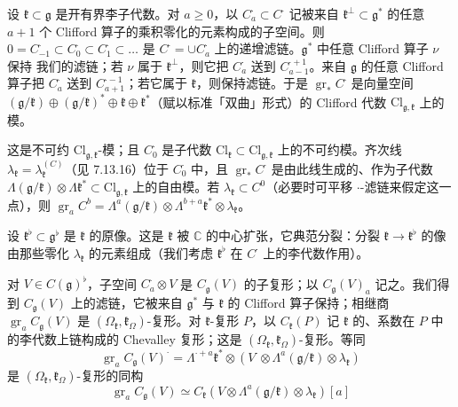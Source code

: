  设 $\mathfrak{k}\subset\mathfrak{g}$ 是开有界李子代数。对 $a\ge0$，以 $C^{\cdot}_{a}\subset C^{\cdot}$ 记被来自 $\mathfrak{k}^{\perp}\subset\mathfrak{g}^{*}$ 的任意 $a+1$ 个 Clifford 算子的乘积零化的元素构成的子空间。则 $0=C^{\cdot}_{-1}\subset C^{\cdot}_{0}\subset C^{\cdot}_{1}\subset\ldots$ 是 $C^{\cdot}=\cup C^{\cdot}_{a}$ 上的递增滤链。$\mathfrak{g}^{*}$ 中任意 Clifford 算子 $\nu$ 保持%
我们的滤链；若 $\nu$ 属于 $\mathfrak{k}^{\perp}$，则它把 $C^{\cdot}_{a}$ 送到 $C^{\cdot+1}_{a-1}$。来自 $\mathfrak{g}$ 的任意 Clifford 算子把 $C^{\cdot}_{a}$ 送到 $C^{\cdot-1}_{a+1}$；若它属于 $\mathfrak{k}$，则保持滤链。于是 $\operatorname{gr}_{*}C^{\cdot}$ 是向量空间 $(\mathfrak{g}/\mathfrak{k})\oplus(\mathfrak{g}/\mathfrak{k})^{*}\oplus\mathfrak{k}\oplus\mathfrak{k}^{*}$（赋以标准「双曲」形式）的 Clifford 代数 $\mathrm{Cl}_{\mathfrak{g},\mathfrak{k}}$ 上的模。

这是不可约 $\mathrm{Cl}_{\mathfrak{g},\mathfrak{k}}$-模；且 $C^{\cdot}_{0}$ 是子代数 $\mathrm{Cl}_{\mathfrak{k}}\subset\mathrm{Cl}_{\mathfrak{g},\mathfrak{k}}$ 上的不可约模。齐次线 $\lambda_{\mathfrak{k}}=\lambda^{(C)}_{\mathfrak{k}}$（见 7.13.16）位于 $C^{\cdot}_{0}$ 中，且 $\operatorname{gr}_{*}C^{\cdot}$ 是由此线生成的、作为子代数 $\Lambda(\mathfrak{g}/\mathfrak{k})\otimes\Lambda\mathfrak{k}^{*}\subset\mathrm{Cl}_{\mathfrak{g},\mathfrak{k}}$ 上的自由模。若 $\lambda_{\mathfrak{k}}\subset C^{0}$（必要时可平移 $\cdot$-滤链来假定这一点），则 $\operatorname{gr}_{a}C^{b}=\Lambda^{a}(\mathfrak{g}/\mathfrak{k})\otimes\Lambda^{b+a}\mathfrak{k}^{*}\otimes\lambda_{\mathfrak{k}}$。

设 $\mathfrak{k}^{\flat}\subset\mathfrak{g}^{\flat}$ 是 $\mathfrak{k}$ 的原像。这是 $\mathfrak{k}$ 被 $\mathbb{C}$ 的中心扩张，它典范分裂：分裂 $\mathfrak{k}\to\mathfrak{k}^{\flat}$ 的像由那些零化 $\lambda_{\mathfrak{k}}$ 的元素组成（我们考虑 $\mathfrak{k}^{\flat}$ 在 $C^{\cdot}$ 上的李代数作用）。

对 $V\in C(\mathfrak{g})^{\flat}$，子空间 $C^{\cdot}_{a}\otimes V$ 是 $C_{\mathfrak{g}}(V)$ 的子复形；以 $C_{\mathfrak{g}}(V)_{a}$ 记之。我们得到 $C_{\mathfrak{g}}(V)$ 上的滤链，它被来自 $\mathfrak{g}^{*}$ 与 $\mathfrak{k}$ 的 Clifford 算子保持；相继商 $\operatorname{gr}_{a}C_{\mathfrak{g}}(V)$ 是 $(\Omega_{\mathfrak{k}},\mathfrak{k}_{\Omega})$-复形。对 $\mathfrak{k}$-复形 $P$，以 $C_{\mathfrak{k}}(P)$ 记 $\mathfrak{k}$ 的、系数在 $P$ 中的李代数上链构成的 Chevalley 复形；这是 $(\Omega_{\mathfrak{k}},\mathfrak{k}_{\Omega})$-复形。等同
\[
\operatorname{gr}_{a}C_{\mathfrak{g}}(V)^{\cdot}=\Lambda^{\cdot+a}\mathfrak{k}^{*}\otimes(V^{\cdot}\otimes\Lambda^{a}(\mathfrak{g}/\mathfrak{k})\otimes\lambda_{\mathfrak{k}})
\]
是 $(\Omega_{\mathfrak{k}},\mathfrak{k}_{\Omega})$-复形的同构
\begin{equation}\tag{376}
\operatorname{gr}_{a}C_{\mathfrak{g}}(V)\simeq C_{\mathfrak{k}}(V\otimes\Lambda^{a}(\mathfrak{g}/\mathfrak{k})\otimes\lambda_{\mathfrak{k}})[a]
\end{equation}

